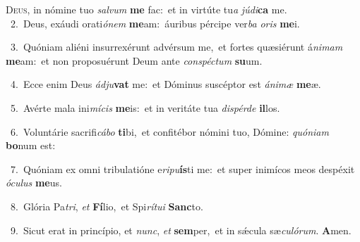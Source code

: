 \lettrine{\initial\textcolor{\initialcolor}{D}}{eus,} in nómine tuo \textit{sal}\-\textit{vum} \textbf{me} fac:~\star et in virtúte tu\textit{a} \textit{jú}\-\textit{di}\textbf{ca} me.\\
{\numbfont\textcolor{\numbcolor}{~2.}}~Deus, exáudi orati\-\textit{ó}\-\textit{nem} \textbf{me}\-am:~\star áuribus pércipe ver\textit{ba} \textit{o}\-\textit{ris} \textbf{me}\-i.\par
{\numbfont\textcolor{\numbcolor}{~3.}}~Quóniam aliéni insurrexérunt advérsum me,~\dagger et fortes quæsiérunt á\-\textit{ni}\-\textit{mam} \textbf{me}\-am:~\star et non proposuérunt Deum ante \textit{con}\-\textit{spéc}\textit{tum} \textbf{su}\-um.\par
{\numbfont\textcolor{\numbcolor}{~4.}}~Ecce enim Deus \textit{ád}\-\textit{ju}\textbf{vat} me:~\star et Dóminus suscéptor est \textit{á}\-\textit{ni}\textit{mæ} \textbf{me}\-æ.\par
{\numbfont\textcolor{\numbcolor}{~5.}}~Avérte mala ini\-\textit{mí}\-\textit{cis} \textbf{me}\-is:~\star et in veritáte tua \textit{dis}\-\textit{pér}\textit{de} \textbf{il}\-los.\par
{\numbfont\textcolor{\numbcolor}{~6.}}~Voluntárie sacrifi\-\textit{cá}\-\textit{bo} \textbf{ti}\-bi,~\star et confitébor nómini tuo, Dómine: \textit{quón}\-\textit{i}\textit{am} \textbf{bo}\-num est:\par
{\numbfont\textcolor{\numbcolor}{~7.}}~Quóniam ex omni tribulatióne e\-\textit{ri}\-\textit{pu}\textbf{ís}ti me:~\star et super inimícos meos despéxit \textit{ó}\-\textit{cu}\textit{lus} \textbf{me}\-us.\par
{\numbfont\textcolor{\numbcolor}{~8.}}~Glória Pa\-\textit{tri}\-, \textit{et} \textbf{Fí}\-lio,~\star et Spi\-\textit{rí}\-\textit{tu}\textit{i} \textbf{Sanc}\-to.\par
{\numbfont\textcolor{\numbcolor}{~9.}}~Sicut erat in princípio, et \textit{nunc}\-, \textit{et} \textbf{sem}\-per,~\star et in sǽcula sæ\-\textit{cu}\-\textit{ló}\textit{rum}. \textbf{A}\-men.\par
